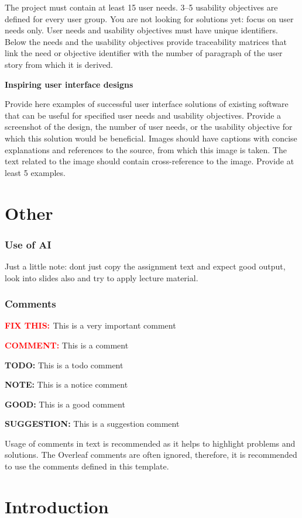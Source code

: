 \documentclass[]{VUMIFTemplateClass}
\newcommand{\yellowcomment}[1]{%
    \begin{tcolorbox}[colback=yellow!80, colframe=yellow!80, arc=0pt, outer arc=0pt, boxrule=0pt, left=3pt, right=3pt, top=3pt, bottom=3pt]
        \textbf{\textcolor{red}{COMMENT:}} #1
    \end{tcolorbox}
}
\newcommand{\warningcomment}[1]{%
    \begin{tcolorbox}[colback=yellow!90, colframe=red, arc=0pt, outer arc=0pt, boxrule=2pt, left=5pt, right=5pt, top=5pt, bottom=5pt]
        \Large\textbf{\textcolor{red}{FIX THIS: }} \normalsize #1
    \end{tcolorbox}
}
\newcommand{\goodcomment}[1]{%
    \begin{tcolorbox}[colback=green!20, colframe=green!60, arc=0pt, outer arc=0pt, boxrule=1pt, left=3pt, right=3pt, top=3pt, bottom=3pt]
        \textbf{\textcolor{green!70!black}{GOOD:}} #1
    \end{tcolorbox}
}
\newcommand{\noticecomment}[1]{%
    \begin{tcolorbox}[colback=blue!20, colframe=blue!60, arc=0pt, outer arc=0pt, boxrule=1pt, left=3pt, right=3pt, top=3pt, bottom=3pt]
        \textbf{\textcolor{blue!70!black}{NOTE:}} #1
    \end{tcolorbox}
}
\newcommand{\todocomment}[1]{%
    \begin{tcolorbox}[colback=red!20, colframe=red!60, arc=0pt, outer arc=0pt, boxrule=1pt, left=3pt, right=3pt, top=3pt, bottom=3pt]
        \textbf{\textcolor{orange!70!black}{TODO:}} #1
    \end{tcolorbox}
}
\newcommand{\suggestioncomment}[1]{%
    \definecolor{lime}{RGB}{50,205,50}%
    \begin{tcolorbox}[colback=lime!15, colframe=lime!60, arc=0pt, outer arc=0pt, boxrule=1pt, left=3pt, right=3pt, top=3pt, bottom=3pt]
        \textbf{\textcolor{lime!70!black}{SUGGESTION:}} #1
    \end{tcolorbox}%
}
\begin{document}
The project must contain at least 15 user needs. 3–5 usability objectives are
defined for every user group. You are not looking for solutions yet: focus on
user needs only. User needs and usability objectives must have unique
identifiers. Below the needs and the usability objectives provide traceability
matrices that link the need or objective identifier with the number of paragraph
of the user story from which it is derived.

\textbf{Inspiring user interface designs}

Provide here examples of successful user interface solutions of existing
software that can be useful for specified user needs and usability objectives.
Provide a screenshot of the design, the number of user needs, or the usability
objective for which this solution would be beneficial. Images should have
captions with concise explanations and references to the source, from which this
image is taken. The text related to the image should contain cross-reference to
the image. Provide at least 5 examples.

\section*{Other}

\subsubsection*{Use of AI}

Just a little note: dont just copy the assignment text and expect good output,
look into slides also and try to apply lecture material. 

\subsubsection*{Comments}

\warningcomment{This is a very important comment}
\yellowcomment{This is a comment}
\todocomment{This is a todo comment}
\noticecomment{This is a notice comment}
\goodcomment{This is a good comment}
\suggestioncomment{This is a suggestion comment}

Usage of comments in text is recommended as it helps to highlight problems and
solutions. The Overleaf comments are often ignored, therefore, it is recommended
to use the comments defined in this template.

\section{Introduction}
\end{document}
